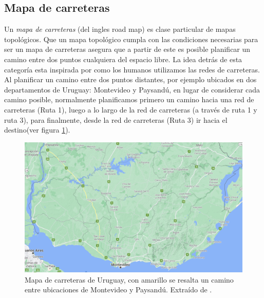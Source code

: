 
\subsection{Mapa de carreteras}
Un \emph{mapa de carreteras} (del ingles road map) \cite{choset2005principles} es clase particular de mapas topológicos. Que un mapa topológico cumpla con las condiciones necesarias para ser un mapa de carreteras asegura que a partir de este es posible planificar un camino entre dos puntos cualquiera del espacio libre. La idea detrás de esta categoría esta inspirada por como los humanos utilizamos las redes de carreteras. Al planificar un camino entre dos puntos distantes, por ejemplo ubicados en dos departamentos de Uruguay: Montevideo y Paysandú, en lugar de considerar cada camino posible, normalmente planificamos primero un camino hacia una red de carreteras (Ruta 1), luego a lo largo de la red de carreteras (a través de ruta 1 y ruta 3), para finalmente, desde la red de carreteras (Ruta 3) ir hacia el destino(ver figura \ref{fig:ejemplovial}). 

\begin{figure}[H]
  \center
  \includegraphics[width=0.9\linewidth]{imagenes/uruguayvialMarcado.png}
  \caption{Mapa de carreteras de Uruguay, con amarillo se resalta un camino entre ubicaciones de Montevideo y Paysandú. Extraído de \cite{googlemaps}.}\label{fig:ejemplovial}
\end{figure} 

